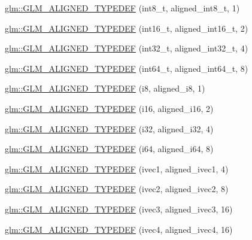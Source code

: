 \begin{DoxyCompactItemize}
\item 
\hyperlink{group__gtx__type__aligned_ga848aedf13e2d9738acf0bb482c590174}{glm\-::\-G\-L\-M\-\_\-\-A\-L\-I\-G\-N\-E\-D\-\_\-\-T\-Y\-P\-E\-D\-E\-F} (int8\-\_\-t, aligned\-\_\-int8\-\_\-t, 1)
\item 
\hyperlink{group__gtx__type__aligned_gafd2803d39049dd45a37a63931e25d943}{glm\-::\-G\-L\-M\-\_\-\-A\-L\-I\-G\-N\-E\-D\-\_\-\-T\-Y\-P\-E\-D\-E\-F} (int16\-\_\-t, aligned\-\_\-int16\-\_\-t, 2)
\item 
\hyperlink{group__gtx__type__aligned_gae553b33349d6da832cf0724f1e024094}{glm\-::\-G\-L\-M\-\_\-\-A\-L\-I\-G\-N\-E\-D\-\_\-\-T\-Y\-P\-E\-D\-E\-F} (int32\-\_\-t, aligned\-\_\-int32\-\_\-t, 4)
\item 
\hyperlink{group__gtx__type__aligned_ga16d223a2b3409e812e1d3bd87f0e9e5c}{glm\-::\-G\-L\-M\-\_\-\-A\-L\-I\-G\-N\-E\-D\-\_\-\-T\-Y\-P\-E\-D\-E\-F} (int64\-\_\-t, aligned\-\_\-int64\-\_\-t, 8)
\item 
\hyperlink{group__gtx__type__aligned_ga2de065d2ddfdb366bcd0febca79ae2ad}{glm\-::\-G\-L\-M\-\_\-\-A\-L\-I\-G\-N\-E\-D\-\_\-\-T\-Y\-P\-E\-D\-E\-F} (i8, aligned\-\_\-i8, 1)
\item 
\hyperlink{group__gtx__type__aligned_gabd786bdc20a11c8cb05c92c8212e28d3}{glm\-::\-G\-L\-M\-\_\-\-A\-L\-I\-G\-N\-E\-D\-\_\-\-T\-Y\-P\-E\-D\-E\-F} (i16, aligned\-\_\-i16, 2)
\item 
\hyperlink{group__gtx__type__aligned_gad4aefe56691cdb640c72f0d46d3fb532}{glm\-::\-G\-L\-M\-\_\-\-A\-L\-I\-G\-N\-E\-D\-\_\-\-T\-Y\-P\-E\-D\-E\-F} (i32, aligned\-\_\-i32, 4)
\item 
\hyperlink{group__gtx__type__aligned_ga8fe9745f7de24a8394518152ff9fccdc}{glm\-::\-G\-L\-M\-\_\-\-A\-L\-I\-G\-N\-E\-D\-\_\-\-T\-Y\-P\-E\-D\-E\-F} (i64, aligned\-\_\-i64, 8)
\item 
\hyperlink{group__gtx__type__aligned_gaaad735483450099f7f882d4e3a3569bd}{glm\-::\-G\-L\-M\-\_\-\-A\-L\-I\-G\-N\-E\-D\-\_\-\-T\-Y\-P\-E\-D\-E\-F} (ivec1, aligned\-\_\-ivec1, 4)
\item 
\hyperlink{group__gtx__type__aligned_gac7b6f823802edbd6edbaf70ea25bf068}{glm\-::\-G\-L\-M\-\_\-\-A\-L\-I\-G\-N\-E\-D\-\_\-\-T\-Y\-P\-E\-D\-E\-F} (ivec2, aligned\-\_\-ivec2, 8)
\item 
\hyperlink{group__gtx__type__aligned_ga3e235bcd2b8029613f25b8d40a2d3ef7}{glm\-::\-G\-L\-M\-\_\-\-A\-L\-I\-G\-N\-E\-D\-\_\-\-T\-Y\-P\-E\-D\-E\-F} (ivec3, aligned\-\_\-ivec3, 16)
\item 
\hyperlink{group__gtx__type__aligned_ga50d8a9523968c77f8325b4c9bfbff41e}{glm\-::\-G\-L\-M\-\_\-\-A\-L\-I\-G\-N\-E\-D\-\_\-\-T\-Y\-P\-E\-D\-E\-F} (ivec4, aligned\-\_\-ivec4, 16)

\end{DoxyCompactItemize}
